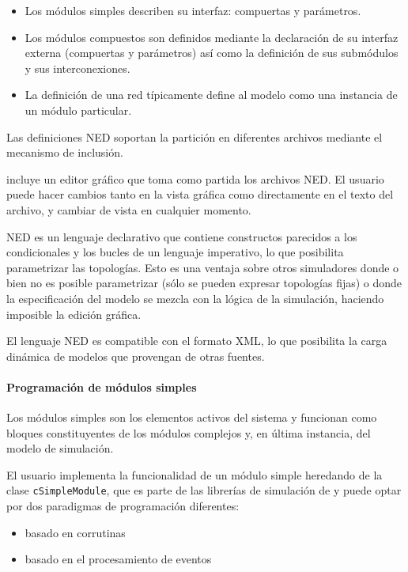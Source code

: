\begin{itemize}
    \item Los módulos simples describen su interfaz: compuertas y parámetros.

    \item Los módulos compuestos son definidos mediante la declaración de su
interfaz externa (compuertas y parámetros) así como la definición de sus
submódulos y sus interconexiones.

    \item La definición de una red típicamente define al modelo como una
instancia de un módulo particular.
\end{itemize}

Las definiciones NED soportan la partición en diferentes archivos mediante el
mecanismo de inclusión.

\omnetpp{} incluye un editor gráfico que toma como partida los archivos NED. El
usuario puede hacer cambios tanto en la vista gráfica como directamente en el
texto del archivo, y cambiar de vista en cualquier momento.

NED es un lenguaje declarativo que contiene constructos parecidos a los
condicionales y los bucles de un lenguaje imperativo, lo que posibilita
parametrizar las topologías. Esto es una ventaja sobre otros simuladores donde
o bien no es posible parametrizar (sólo se pueden expresar topologías fijas) o
donde la especificación del modelo se mezcla con la lógica de la simulación,
haciendo imposible la edición gráfica.

El lenguaje NED es compatible con el formato XML, lo que posibilita la carga
dinámica de modelos que provengan de otras fuentes.

\paragraph{Programación de módulos simples}

Los módulos simples son los elementos activos del sistema y funcionan como
bloques constituyentes de los módulos complejos y, en última instancia, del
modelo de simulación.

El usuario implementa la funcionalidad de un módulo simple heredando de la
clase \verb!cSimpleModule!, que es parte de las librerías de simulación de
\omnetpp{} y puede optar por dos paradigmas de programación diferentes:

\begin{itemize}
    \item basado en corrutinas
    \item basado en el procesamiento de eventos
\end{itemize}

